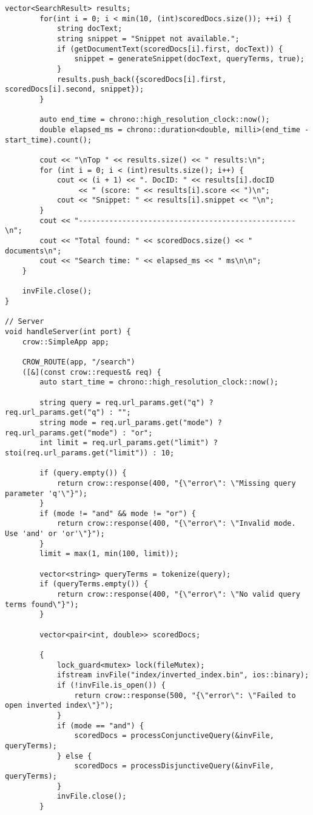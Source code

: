 \documentclass{article}
\begin{document}
\begin{lstlisting}[caption={The complete source code for the query processor component.}, label={lst:query}]
        vector<SearchResult> results;
        for(int i = 0; i < min(10, (int)scoredDocs.size()); ++i) {
            string docText;
            string snippet = "Snippet not available.";
            if (getDocumentText(scoredDocs[i].first, docText)) {
                snippet = generateSnippet(docText, queryTerms, true);
            }
            results.push_back({scoredDocs[i].first, scoredDocs[i].second, snippet});
        }

        auto end_time = chrono::high_resolution_clock::now();
        double elapsed_ms = chrono::duration<double, milli>(end_time - start_time).count();
        
        cout << "\nTop " << results.size() << " results:\n";
        for (int i = 0; i < (int)results.size(); i++) {
            cout << (i + 1) << ". DocID: " << results[i].docID 
                 << " (score: " << results[i].score << ")\n";
            cout << "Snippet: " << results[i].snippet << "\n";
        }
        cout << "--------------------------------------------------\n";
        cout << "Total found: " << scoredDocs.size() << " documents\n";
        cout << "Search time: " << elapsed_ms << " ms\n\n";
    }
    
    invFile.close();
}

// Server
void handleServer(int port) {
    crow::SimpleApp app;
    
    CROW_ROUTE(app, "/search")
    ([&](const crow::request& req) {
        auto start_time = chrono::high_resolution_clock::now();
        
        string query = req.url_params.get("q") ? req.url_params.get("q") : "";
        string mode = req.url_params.get("mode") ? req.url_params.get("mode") : "or";
        int limit = req.url_params.get("limit") ? stoi(req.url_params.get("limit")) : 10;
        
        if (query.empty()) {
            return crow::response(400, "{\"error\": \"Missing query parameter 'q'\"}");
        }
        if (mode != "and" && mode != "or") {
            return crow::response(400, "{\"error\": \"Invalid mode. Use 'and' or 'or'\"}");
        }
        limit = max(1, min(100, limit));
        
        vector<string> queryTerms = tokenize(query);
        if (queryTerms.empty()) {
            return crow::response(400, "{\"error\": \"No valid query terms found\"}");
        }
        
        vector<pair<int, double>> scoredDocs;
        
        {
            lock_guard<mutex> lock(fileMutex);
            ifstream invFile("index/inverted_index.bin", ios::binary);
            if (!invFile.is_open()) {
                return crow::response(500, "{\"error\": \"Failed to open inverted index\"}");
            }
            if (mode == "and") {
                scoredDocs = processConjunctiveQuery(&invFile, queryTerms);
            } else {
                scoredDocs = processDisjunctiveQuery(&invFile, queryTerms);
            }
            invFile.close();
        }
        

\end{lstlisting}
\end{document}

